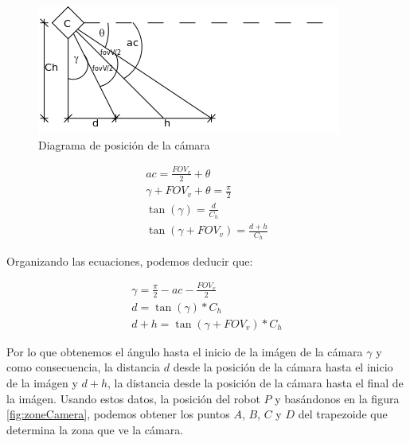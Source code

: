 \begin{figure}[htp]
\begin{center}
\includegraphics{comportamientos/figures/angleCamera.png}
\caption{Diagrama de posici\'on de la c\'amara}
\label{fig:angleCamera}
\end{center}
\end{figure}

\begin{eqnarray}
ac = \frac{FOV_v}{2} + \theta\\
\gamma + FOV_v + \theta = \frac{\pi}{2}\\
\tan(\gamma) = \frac{d}{C_h}\\
\tan(\gamma+FOV_v) = \frac{d+h}{C_h}
\end{eqnarray}

Organizando las ecuaciones, podemos deducir que:

\begin{eqnarray}
\gamma = \frac{\pi}{2} - ac - \frac{FOV_v}{2}\\
\label{eqn:distance_d}
d = \tan(\gamma) * C_h \\
\label{eqn:distance_dh}
d+h = \tan(\gamma+FOV_v) * C_h
\label{wander:ecfov}
\end{eqnarray}

Por lo que obtenemos el \'angulo hasta el inicio de la im\'agen de la c\'amara
$\gamma$ y como consecuencia, la distancia $d$ desde la posici\'on de la
c\'amara hasta el inicio de la im\'agen y $d+h$, la distancia desde la
posici\'on de la c\'amara hasta el final de la im\'agen. Usando estos datos,
la posici\'on del robot $P$ y bas\'andonos en la figura \ref{fig:zoneCamera},
podemos obtener los puntos $A$, $B$, $C$ y $D$ del trapezoide que determina la
zona que ve la c\'amara.

